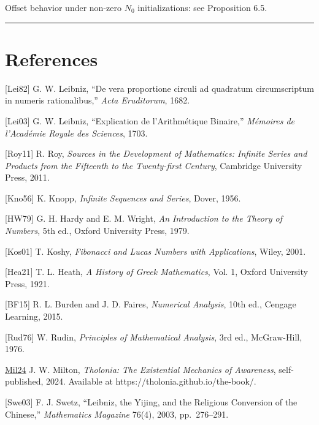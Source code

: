 \documentclass[12pt]{article}
\begin{document}
Offset behavior under non-zero \(N_0\) initializations: see Proposition
6.5.

\begin{center}\rule{0.5\linewidth}{0.5pt}\end{center}

\section{References}\label{references}

{[}Lei82{]} G. W. Leibniz, ``De vera proportione circuli ad quadratum
circumscriptum in numeris rationalibus,'' \emph{Acta Eruditorum}, 1682.

{[}Lei03{]} G. W. Leibniz, ``Explication de l'Arithmétique Binaire,''
\emph{Mémoires de l'Académie Royale des Sciences}, 1703.

{[}Roy11{]} R. Roy, \emph{Sources in the Development of Mathematics:
Infinite Series and Products from the Fifteenth to the Twenty-first
Century}, Cambridge University Press, 2011.

{[}Kno56{]} K. Knopp, \emph{Infinite Sequences and Series}, Dover, 1956.

{[}HW79{]} G. H. Hardy and E. M. Wright, \emph{An Introduction to the
Theory of Numbers}, 5th ed., Oxford University Press, 1979.

{[}Kos01{]} T. Koshy, \emph{Fibonacci and Lucas Numbers with
Applications}, Wiley, 2001.

{[}Hea21{]} T. L. Heath, \emph{A History of Greek Mathematics}, Vol. 1,
Oxford University Press, 1921.

{[}BF15{]} R. L. Burden and J. D. Faires, \emph{Numerical Analysis},
10th ed., Cengage Learning, 2015.

{[}Rud76{]} W. Rudin, \emph{Principles of Mathematical Analysis}, 3rd
ed., McGraw-Hill, 1976.

\href{https://tholonia.github.io/the-book/}{Mil24} J. W. Milton,
\emph{Tholonia: The Existential Mechanics of Awareness}, self-published,
2024. Available at https://tholonia.github.io/the-book/.

{[}Swe03{]} F. J. Swetz, ``Leibniz, the Yijing, and the Religious
Conversion of the Chinese,'' \emph{Mathematics Magazine} 76(4), 2003,
pp.~276--291.
\end{document}
